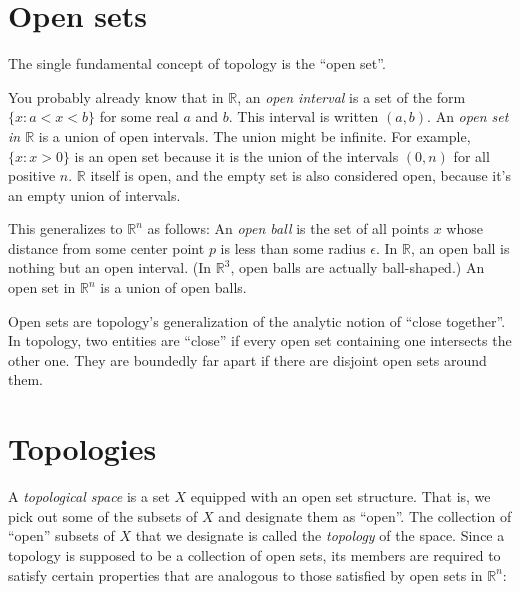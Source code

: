 \documentclass{article}
\def\R{{\mathbb R}}
\def\Rn{{\R^n}}
\begin{document}
\section*{Open sets}

The single fundamental concept of topology is the ``open set''.

You probably already know that in $\R$, an {\em open interval} is a set
of the form $\{x : a < x < b \}$ for some real $a$ and $b$.  This
interval is written $(a, b)$.  An {\em open set in $\R$} is a union of
open intervals.  The union might be infinite.  For example, $\{ x : x
> 0 \}$ is an open set because it is the union of the intervals $(0,
n)$ for all positive $n$.  $\R$ itself is open, and the empty set is
also considered open, because it's an empty union of intervals.

This generalizes to $\Rn$ as follows: An {\em open ball\/} is the set
of all points $x$ whose distance from some center point $p$ is less
than some radius $\epsilon$.  In $\R$, an open ball is nothing but an
open interval.  (In $\R^3$, open balls are actually ball-shaped.)  An
open set in $\Rn$ is a union of open balls.


Open sets are topology's generalization of the analytic notion of
``close together''.  In topology, two entities are ``close'' if every
open set containing one intersects the other one.  They are boundedly
far apart if there are disjoint open sets around them.

\section*{Topologies}

A {\em topological space\/} is a set $X$ equipped with an open set
structure.  That is, we pick out some of the subsets of $X$ and
designate them as ``open''.  The collection of ``open'' subsets of $X$
that we designate is called the {\em topology\/} of the space.
Since a topology is supposed to be a collection of open sets, its
members are required to satisfy certain properties that are analogous
to those satisfied by open sets in $\Rn$:
\end{document}
